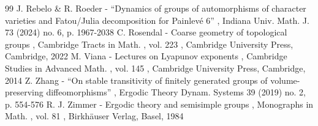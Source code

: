 \documentclass[11pt]{article}
\theoremstyle{plain}
\theoremstyle{definition}
\numberwithin{equation}{section}
\begin{document}
\begin{thebibliography}{99}
 J. Rebelo \& R. Roeder - “Dynamics of groups of automorphisms of character varieties and Fatou/Julia decomposition for Painlevé 6” , Indiana Univ. Math. J. 73 (2024) no. 6, p. 1967-2038
 C. Rosendal - Coarse geometry of topological groups , Cambridge Tracts in Math. , vol. 223 , Cambridge University Press, Cambridge, 2022
 M. Viana - Lectures on Lyapunov exponents , Cambridge Studies in Advanced Math. , vol. 145 , Cambridge University Press, Cambridge, 2014
 Z. Zhang - “On stable transitivity of finitely generated groups of volume-preserving diffeomorphisms” , Ergodic Theory Dynam. Systems 39 (2019) no. 2, p. 554-576
 R. J. Zimmer - Ergodic theory and semisimple groups , Monographs in Math. , vol. 81 , Birkhäuser Verlag, Basel, 1984
\end{thebibliography}
\end{document}
